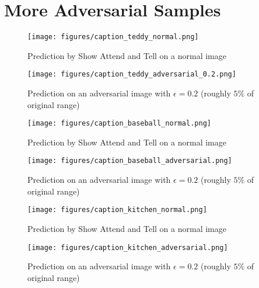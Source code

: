 



\section{More Adversarial Samples} \label{more_adv_captions}
\begin{figure*}[ht]
    \centering
    \begin{minipage}{0.45\textwidth}
        \centering
        \texttt{[image: figures/caption\_teddy\_normal.png]} %
        \caption{Prediction by Show Attend and Tell on a normal image}
    \end{minipage}\hfill
    \begin{minipage}{0.45\textwidth}
        \centering
        \texttt{[image: figures/caption\_teddy\_adversarial\_0.2.png]} %
        \caption{Prediction on an adversarial image with $\epsilon=0.2$ (roughly $5\%$ of original range)}
    \end{minipage}
\end{figure*}

\begin{figure*}[ht]
    \centering
    \begin{minipage}{0.45\textwidth}
        \centering
        \texttt{[image: figures/caption\_baseball\_normal.png]} %
        \caption{Prediction by Show Attend and Tell on a normal image}
    \end{minipage}\hfill
    \begin{minipage}{0.45\textwidth}
        \centering
        \texttt{[image: figures/caption\_baseball\_adversarial.png]} %
        \caption{Prediction on an adversarial image with $\epsilon=0.2$ (roughly $5\%$ of original range)}
    \end{minipage}
\end{figure*}

\begin{figure*}[ht]
    \centering
    \begin{minipage}{0.45\textwidth}
        \centering
        \texttt{[image: figures/caption\_kitchen\_normal.png]} %
        \caption{Prediction by Show Attend and Tell on a normal image}
    \end{minipage}\hfill
    \begin{minipage}{0.45\textwidth}
        \centering
        \texttt{[image: figures/caption\_kitchen\_adversarial.png]} %
        \caption{Prediction on an adversarial image with $\epsilon=0.2$ (roughly $5\%$ of original range)}
    \end{minipage}
\end{figure*}

